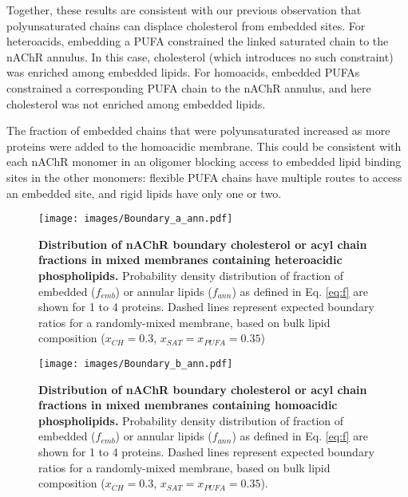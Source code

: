 Together, these results are consistent with our previous \citep{Sharp2019} observation that polyunsaturated chains can displace cholesterol from embedded sites.  For heteroacids,  embedding a PUFA constrained the linked saturated chain to the nAChR annulus. In this case, cholesterol (which introduces no such constraint) was enriched among embedded lipids.  For homoacids, embedded PUFAs constrained a corresponding PUFA chain to the nAChR annulus, and here cholesterol was not enriched among embedded lipids. 

The fraction of embedded chains that were polyunsaturated increased as more proteins were added to the homoacidic membrane. This could be consistent with each nAChR monomer in an oligomer blocking access to embedded lipid binding sites in the other monomers: flexible PUFA chains have multiple routes to access an embedded site, and rigid lipids have only one or two.  %

\begin{figure}[htp]
\centering
\texttt{[image: images/Boundary\_a\_ann.pdf]}
\caption[nAChR boundary lipid preferences.]{{\bf Distribution of nAChR boundary cholesterol or acyl chain fractions in mixed membranes containing heteroacidic phospholipids.} Probability density distribution of fraction of embedded ($f_{emb}$) or annular lipids ($f_{ann}$) as defined in Eq. \ref{eq:f} are shown for 1 to 4 proteins.  Dashed lines represent expected boundary ratios for a randomly-mixed membrane, based on bulk lipid composition ($x_{CH} = 0.3$, $x_{SAT}=x_{PUFA}= 0.35$)}
  \label{fig:Fig2a}
\end{figure}

\begin{figure}[htp]
\centering
\texttt{[image: images/Boundary\_b\_ann.pdf]}
\caption[nAChR boundary lipid preferences.]{{\bf Distribution of nAChR boundary cholesterol or acyl chain fractions in mixed membranes containing homoacidic phospholipids.} Probability density distribution of fraction of embedded ($f_{emb}$) or annular lipids ($f_{ann}$) as defined in Eq. \ref{eq:f} are shown for 1 to 4 proteins.  Dashed lines represent expected boundary ratios for a randomly-mixed membrane, based on bulk lipid composition ($x_{CH} = 0.3$, $x_{SAT}=x_{PUFA}= 0.35$).} \label{fig:Fig2b}
\end{figure}


